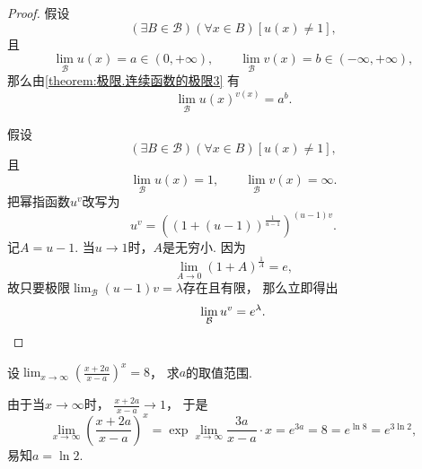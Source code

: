 \begin{proposition}[幂指函数的极限]
\begin{proof}
假设\begin{equation*}
	(\exists B\in\mathcal{B})
	(\forall x \in B)
	[u(x)\neq1],
\end{equation*}且\begin{equation*}
	\lim_\mathcal{B} u(x) = a \in (0,+\infty), \qquad
	\lim_\mathcal{B} v(x) = b \in (-\infty,+\infty),
\end{equation*}
那么由\cref{theorem:极限.连续函数的极限3} 有\begin{equation*}
	\lim_\mathcal{B} u(x)^{v(x)} = a^b.
\end{equation*}

假设\begin{equation*}
	(\exists B\in\mathcal{B})
	(\forall x \in B)
	[u(x)\neq1],
\end{equation*}且\begin{equation*}
	\lim_\mathcal{B} u(x) = 1, \qquad
	\lim_\mathcal{B} v(x) = \infty.
\end{equation*}
把幂指函数\(u^v\)改写为\begin{equation*}
	u^v = \left((1+(u-1))^{\frac1{u-1}}\right)^{(u-1)v}.
\end{equation*}
记\(A = u - 1\).
当\(u \to 1\)时，\(A\)是无穷小.
因为\begin{equation*}
	\lim_{A\to0} (1+A)^{\frac1A} = e,
\end{equation*}
故只要极限\(\lim_\mathcal{B} (u-1) v = \lambda\)存在且有限，
那么立即得出\begin{equation*}
	\lim_\mathcal{B} u^v = e^\lambda.
	\qedhere
\end{equation*}
\end{proof}
\end{proposition}

\begin{example}
设\(\lim_{x\to\infty} \left( \frac{x+2a}{x-a} \right)^x = 8\)，
求\(a\)的取值范围.
\begin{solution}
由于当\(x\to\infty\)时，
\(\frac{x+2a}{x-a} \to 1\)，
于是\begin{equation*}
	\lim_{x\to\infty} \left( \frac{x+2a}{x-a} \right)^x
	= \exp\lim_{x\to\infty} \frac{3a}{x-a} \cdot x
	= e^{3a}
	= 8 = e^{\ln8} = e^{3\ln2},
\end{equation*}
易知\(a = \ln2\).
\end{solution}
\end{example}

